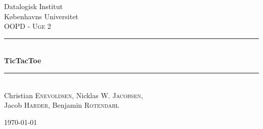 \documentclass[]{article}
\newcommand{\HRule}{\rule{\linewidth}{0.5mm}}
\begin{document}
\begin{titlepage}
\begin{center}
{\LARGE Datalogisk Institut \\Københavns Universitet}\\[0.5cm]

\textsc{\Large OOPD - Uge 2}\\[0.5cm]

\HRule \\[0.4cm]
{ \huge \bfseries TicTacToe \\[0.4cm] }

\HRule \\[1.0cm]

Christian \textsc{Enevoldsen},
Nicklas W. \textsc{Jacobsen},\\
Jacob \textsc{Harder},
Benjamin \textsc{Rotendahl}

\vfill

{\large \today}

\end{center}
\end{titlepage}
\end{document}
